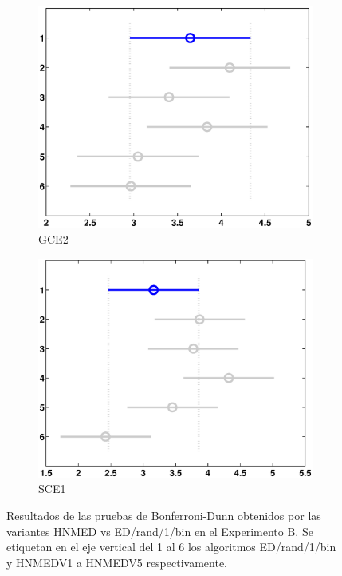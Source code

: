 \begin{figure}
\begin{subfigure}[b]{0.49\linewidth}
		\includegraphics[width=\linewidth]{Figures/B-Bonferroni_HNMED_VS_ED5}
		\caption{GCE2} \label{fig:Bon_G2} 
	\end{subfigure}
	\begin{subfigure}[b]{0.49\linewidth}
		\includegraphics[width=\linewidth]{Figures/B-Bonferroni_HNMED_VS_ED6}
		\caption{SCE1} \label{fig:Bon_S1} 
	\end{subfigure}
	\caption[Resultados de las pruebas de Bonferroni-Dunn  obtenidos por las variantes HNMED vs ED/rand/1/bin en el Experimento B.]{Resultados de las pruebas de Bonferroni-Dunn  obtenidos por las variantes HNMED vs ED/rand/1/bin en el Experimento B. Se etiquetan en el eje vertical del 1 al 6 los algoritmos ED/rand/1/bin y HNMEDV1 a HNMEDV5   respectivamente.} \label{fig: Resultados de las pruebas de Bonferroni-Dunn para las variantes HNMED vs ED/rand/1/bin en el Experitmento B} 
	
\end{figure}
%


